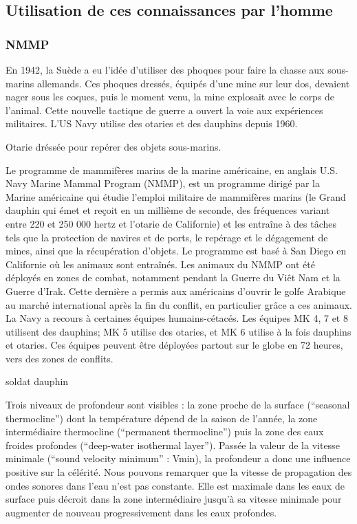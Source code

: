 \subsection{Utilisation de ces connaissances par
l'homme}\label{utilisation-de-ces-connaissances-par-lhomme}

\subsubsection{NMMP}\label{nmmp}

En 1942, la Suède a eu l'idée d'utiliser des phoques pour faire la
chasse aux sous-marins allemands. Ces phoques dressés, équipés d'une
mine sur leur dos, devaient nager sous les coques, puis le moment venu,
la mine explosait avec le corps de l'animal. Cette nouvelle tactique de
guerre a ouvert la voie aux expériences militaires. L'US Navy utilise
des otaries et des dauphins depuis 1960.

Otarie dréssée pour repérer des objets sous-marins.

Le programme de mammifères marins de la marine américaine, en anglais
U.S. Navy Marine Mammal Program (NMMP), est un programme dirigé par la
Marine américaine qui étudie l'emploi militaire de mammifères marins (le
Grand dauphin qui émet et reçoit en un millième de seconde, des
fréquences variant entre 220 et 250 000 hertz et l'otarie de Californie)
et les entraîne à des tâches tels que la protection de navires et de
ports, le repérage et le dégagement de mines, ainsi que la récupération
d'objets. Le programme est basé à San Diego en Californie où les animaux
sont entraînés. Les animaux du NMMP ont été déployés en zones de combat,
notamment pendant la Guerre du Viêt Nam et la Guerre d'Irak. Cette
dernière a permis aux américains d'ouvrir le golfe Arabique au marché
international après la fin du conflit, en particulier grâce a ces
animaux. La Navy a recours à certaines équipes humains-cétacés. Les
équipes MK 4, 7 et 8 utilisent des dauphins; MK 5 utilise des otaries,
et MK 6 utilise à la fois dauphins et otaries. Ces équipes peuvent être
déployées partout sur le globe en 72 heures, vers des zones de conflits.

soldat dauphin

Trois niveaux de profondeur sont visibles : la zone proche de la surface
(``seasonal thermocline'') dont la température dépend de la saison de
l'année, la zone intermédiaire thermocline (``permanent thermocline'')
puis la zone des eaux froides profondes (``deep-water isothermal
layer''). Passée la valeur de la vitesse minimale (``sound velocity
minimum'' : Vmin), la profondeur a donc une influence positive sur la
célérité. Nous pouvons remarquer que la vitesse de propagation des ondes
sonores dans l'eau n'est pas constante. Elle est maximale dans les eaux
de surface puis décroit dans la zone intermédiaire jusqu'à sa vitesse
minimale pour augmenter de nouveau progressivement dans les eaux
profondes.

